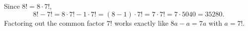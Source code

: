 Since $8!=8\cdot7!$,
\[
8!-7!=8\cdot7!-1\cdot7!=(8-1)\cdot7!=7\cdot7!=7\cdot5040=\boxed{35280}.
\]
Factoring out the common factor $7!$ works exactly like $8a-a=7a$ with $a=7!$.
